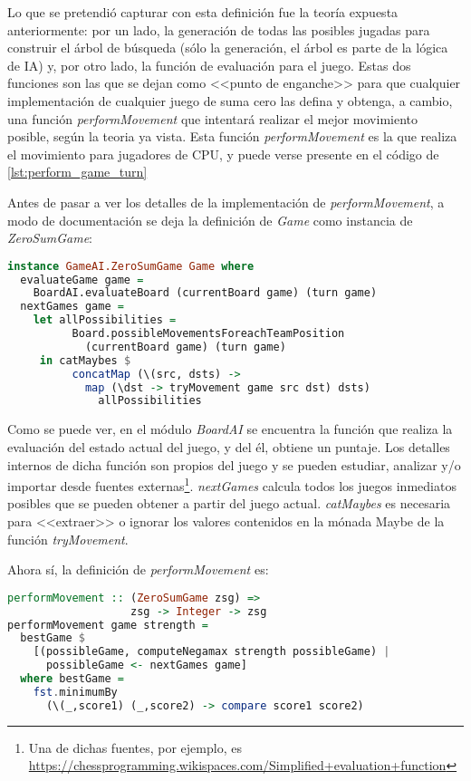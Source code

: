 \documentclass{llncs}
\begin{document}
Lo que se pretendió capturar con esta definición fue la teoría expuesta anteriormente: por un lado, la generación de todas las posibles jugadas para construir el árbol de búsqueda (sólo la generación, el árbol es parte de la lógica de IA) y, por otro lado, la función de evaluación para el juego. Estas dos funciones son las que se dejan como <<punto de enganche>> para que cualquier implementación de cualquier juego de suma cero las defina y obtenga, a cambio, una función \textit{performMovement} que intentará realizar el mejor movimiento posible, según la teoria ya vista. Esta función \textit{performMovement} es la que realiza el movimiento para jugadores de CPU, y puede verse presente en el código de \ref{lst:perform_game_turn}

Antes de pasar a ver los detalles de la implementación de \textit{performMovement}, a modo de documentación se deja la definición de \textit{Game} como instancia de \textit{ZeroSumGame}:


\begin{lstlisting}[frame=single, language=haskell, captionpos=b, caption=Definición de Game como instancia de ZeroSumGame, label={lst:zero_sum_game_instance}]
instance GameAI.ZeroSumGame Game where
  evaluateGame game =
    BoardAI.evaluateBoard (currentBoard game) (turn game)
  nextGames game =
    let allPossibilities =
          Board.possibleMovementsForeachTeamPosition
            (currentBoard game) (turn game)
     in catMaybes $
          concatMap (\(src, dsts) ->
            map (\dst -> tryMovement game src dst) dsts)
              allPossibilities
\end{lstlisting}

Como se puede ver, en el módulo \textit{BoardAI} se encuentra la función que realiza la evaluación del estado actual del juego, y del él, obtiene un puntaje. Los detalles internos de dicha función son propios del juego y se pueden estudiar, analizar y/o importar desde fuentes externas\footnote{Una de dichas fuentes, por ejemplo, es \url{https://chessprogramming.wikispaces.com/Simplified+evaluation+function}}. \textit{nextGames} calcula todos los juegos inmediatos posibles que se pueden obtener a partir del juego actual. \textit{catMaybes} es necesaria para <<extraer>> o ignorar los valores contenidos en la mónada Maybe de la función \textit{tryMovement}.

Ahora sí, la definición de \textit{performMovement} es:

\begin{lstlisting}[frame=single, language=haskell, captionpos=b, caption=Definición de performMovement, label={lst:perform_movement}]
performMovement :: (ZeroSumGame zsg) =>
                   zsg -> Integer -> zsg
performMovement game strength =
  bestGame $
    [(possibleGame, computeNegamax strength possibleGame) |
      possibleGame <- nextGames game]
  where bestGame =
    fst.minimumBy
      (\(_,score1) (_,score2) -> compare score1 score2)
\end{lstlisting}
\end{document}
